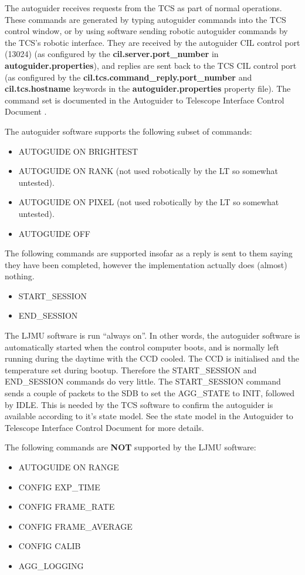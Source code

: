 \documentclass[10pt,a4paper]{article}
\begin{document}
The autoguider receives requests from the TCS as part of normal operations. These commands are generated by typing autoguider commands into the TCS control window, or by using software sending robotic autoguider commands by the TCS's robotic interface. They are received by the autoguider CIL control port (13024) (as configured by the {\bf cil.server.port\_number} in {\bf autoguider.properties}), and replies are sent back to the TCS CIL
control port (as configured by the {\bf cil.tcs.command\_reply.port\_number} and {\bf cil.tcs.hostname} keywords in the {\bf autoguider.properties} property file). The command set is documented in the Autoguider to Telescope Interface Control Document \cite{bib:agtcsicd}.

The autoguider software supports the following subset of commands:
\begin{itemize}
\item AUTOGUIDE ON BRIGHTEST
\item AUTOGUIDE ON RANK (not used robotically by the LT so somewhat untested).
\item AUTOGUIDE ON PIXEL (not used robotically by the LT so somewhat untested).
\item AUTOGUIDE OFF
\end{itemize}

The following commands are supported insofar as a reply is sent to them saying they have been completed,
however the implementation actually does (almost) nothing.
\begin{itemize}
\item START\_SESSION
\item END\_SESSION
\end{itemize}

The LJMU software is run ``always on''. In other words, the autoguider software is automatically started when the control computer boots, and is normally left running during the daytime with the CCD cooled. The CCD is initialised and the temperature set during bootup. Therefore the START\_SESSION and END\_SESSION commands do very little. The START\_SESSION command sends a couple of packets to the SDB to set the AGG\_STATE to INIT, followed by IDLE. This is needed by the TCS software to confirm the autoguider is available according to it's state model. See the state model in the Autoguider to Telescope Interface Control Document \cite{bib:agtcsicd} for more details.

The following commands are {\bf NOT} supported by the LJMU software:
\begin{itemize}
\item AUTOGUIDE ON RANGE
\item CONFIG EXP\_TIME
\item CONFIG FRAME\_RATE
\item CONFIG FRAME\_AVERAGE
\item CONFIG CALIB
\item AGG\_LOGGING
\end{itemize}
\end{document}
